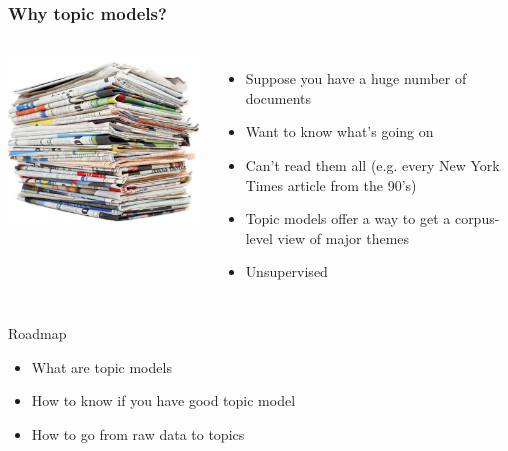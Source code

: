 

\providecommand{\graphscale}{0.6}




\begin{frame}

	\frametitle{Why topic models?}

	\begin{columns}


	\includegraphics[width=1\linewidth]{topic_models/newspapers}


	\begin{itemize}
		\item Suppose you have a huge number of documents
		\item Want to know what's going on
		\item Can't read them all (e.g. every New York Times article from the 90's)
		\item Topic models offer a way to get a corpus-level view of major themes
		\pause
		\item Unsupervised
	\end{itemize}


	\end{columns}

\end{frame}

\begin{frame}{Roadmap}

	\begin{itemize}
		\item What are topic models
		\item How to know if you have good topic model
		\item How to go from raw data to topics
	\end{itemize}

\end{frame}


